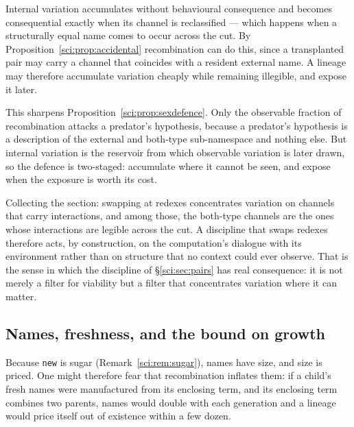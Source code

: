 \begin{corollary}
\label{sci:cor:cryptic}
Internal variation accumulates without behavioural consequence and becomes consequential exactly when
its channel is reclassified --- which happens when a structurally equal name comes to occur across the
cut. By Proposition~\ref{sci:prop:accidental} recombination can do this, since a transplanted pair may
carry a channel that coincides with a resident external name. A lineage may therefore accumulate
variation cheaply while remaining illegible, and expose it later.
\end{corollary}

This sharpens Proposition~\ref{sci:prop:sexdefence}. Only the observable fraction of recombination attacks
a predator's hypothesis, because a predator's hypothesis is a description of the external and
both-type sub-namespace and nothing else. But internal variation is the reservoir from which
observable variation is later drawn, so the defence is two-staged: accumulate where it cannot be seen,
and expose when the exposure is worth its cost.

\begin{remark}
\label{sci:rem:impact}
Collecting the section: swapping at redexes concentrates variation on channels that carry
interactions, and among those, the both-type channels are the ones whose interactions are legible
across the cut. A discipline that swaps redexes therefore acts, by construction, on the computation's
dialogue with its environment rather than on structure that no context could ever observe. That is the
sense in which the discipline of \S\ref{sci:sec:pairs} has real consequence: it is not merely a filter for
viability but a filter that concentrates variation where it can matter.
\end{remark}

\subsection{Names, freshness, and the bound on growth}\label{sci:S12.7}

Because \texttt{new} is sugar (Remark~\ref{sci:rem:sugar}), names have size, and size is priced. One might
therefore fear that recombination inflates them: if a child's fresh names were manufactured from its
enclosing term, and its enclosing term combines two parents, names would double with each generation
and a lineage would price itself out of existence within a few dozen.

